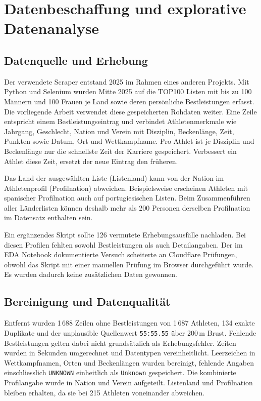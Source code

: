 \section{Datenbeschaffung und explorative Datenanalyse}
\label{sec:daten}

\subsection{Datenquelle und Erhebung}
Der verwendete Scraper entstand 2025 im Rahmen eines anderen Projekts. Mit
Python und Selenium wurden Mitte 2025 auf
\textcite{swimrankings} die TOP100 Listen mit
bis zu 100 Männern und 100 Frauen je Land sowie deren persönliche
Bestleistungen erfasst. Die vorliegende
Arbeit verwendet diese gespeicherten Rohdaten weiter. Eine Zeile entspricht einem Bestleistungseintrag und verbindet Athletenmerkmale wie Jahrgang, Geschlecht, Nation und Verein mit Disziplin, Beckenlänge, Zeit, Punkten sowie Datum, Ort und Wettkampfname. Pro Athlet ist je Disziplin und Beckenlänge nur die schnellste Zeit der Karriere gespeichert. Verbessert ein Athlet diese Zeit, ersetzt der neue Eintrag den früheren.

Das Land der ausgewählten Liste (Listenland) kann von der Nation im
Athletenprofil (Profilnation) abweichen. Beispielsweise erscheinen Athleten
mit spanischer Profilnation auch auf portugiesischen Listen. Beim
Zusammenführen aller Länderlisten können deshalb mehr als 200 Personen
derselben Profilnation im Datensatz enthalten sein.

Ein ergänzendes Skript sollte 126 vermutete Erhebungsausfälle nachladen.
Bei diesen Profilen fehlten sowohl Bestleistungen als auch Detailangaben.
Der im EDA Notebook dokumentierte Versuch scheiterte an Cloudflare
Prüfungen, obwohl das Skript mit einer manuellen Prüfung im Browser durchgeführt wurde. Es wurden dadurch keine zusätzlichen Daten gewonnen.

\subsection{Bereinigung und Datenqualität}
Entfernt wurden 1\,688 Zeilen ohne Bestleistungen von 1\,687 Athleten,
134 exakte Duplikate und der unplausible Quellenwert \texttt{55:55.55}
über 200\,m Brust. Fehlende Bestleistungen gelten dabei nicht grundsätzlich
als Erhebungsfehler. Zeiten wurden in Sekunden umgerechnet und Datentypen
vereinheitlicht. Leerzeichen in Wettkampfnamen, Orten und Beckenlängen
wurden bereinigt, fehlende Angaben einschliesslich \texttt{UNKNOWN}
einheitlich als \texttt{Unknown} gespeichert. Die kombinierte Profilangabe
wurde in Nation und Verein aufgeteilt. Listenland und Profilnation bleiben
erhalten, da sie bei 215 Athleten voneinander abweichen.

